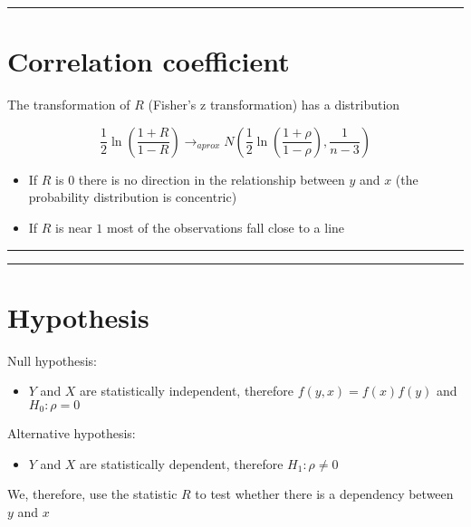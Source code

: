 \documentclass[
]{book}
\providecommand{\tightlist}{%
  \setlength{\itemsep}{0pt}\setlength{\parskip}{0pt}}
\begin{document}
\begin{center}\rule{0.5\linewidth}{0.5pt}\end{center}

\hypertarget{correlation-coefficient}{%
\section{Correlation coefficient}\label{correlation-coefficient}}

The transformation of \(R\) (Fisher's z transformation) has a distribution

\[\frac{1}{2}\ln (\frac{1+R}{1-R}) \rightarrow_{aprox} N(\frac{1}{2}\ln (\frac{1+\rho}{1-\rho}), \frac{1}{n-3})\]

\begin{itemize}
\item
  If \(R\) is \(0\) there is no direction in the relationship between \(y\) and \(x\) (the probability distribution is concentric)
\item
  If \(R\) is near \(1\) most of the observations fall close to a line
\end{itemize}

\begin{center}\rule{0.5\linewidth}{0.5pt}\end{center}

\begin{center}\rule{0.5\linewidth}{0.5pt}\end{center}

\hypertarget{hypothesis-5}{%
\section{Hypothesis}\label{hypothesis-5}}

Null hypothesis:

\begin{itemize}
\tightlist
\item
  \(Y\) and \(X\) are statistically independent, therefore \(f(y,x)=f(x)f(y)\) and \(H_0: \rho=0\)
\end{itemize}

Alternative hypothesis:

\begin{itemize}
\tightlist
\item
  \(Y\) and \(X\) are statistically dependent, therefore \(H_1: \rho \neq 0\)
\end{itemize}

We, therefore, use the statistic \(R\) to test whether there is a dependency between \(y\) and \(x\)
\end{document}
